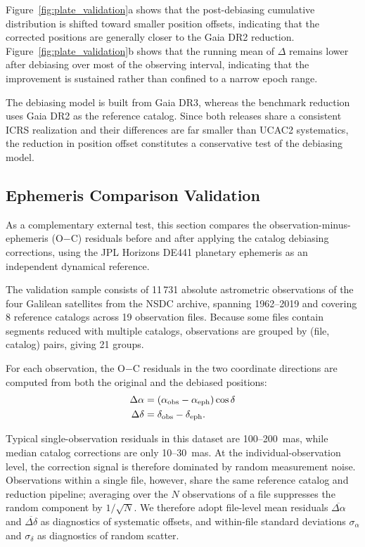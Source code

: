 \documentclass[linenumbers,amsmath,manuscript]{aastex702}
\begin{document}
Figure~\ref{fig:plate_validation}a shows that the post-debiasing cumulative distribution is shifted toward smaller position offsets, indicating that the corrected positions are generally closer to the Gaia DR2 reduction. Figure~\ref{fig:plate_validation}b shows that the running mean of $\Delta$ remains lower after debiasing over most of the observing interval, indicating that the improvement is sustained rather than confined to a narrow epoch range.

The debiasing model is built from Gaia DR3, whereas the benchmark reduction uses Gaia DR2 as the reference catalog. Since both releases share a consistent ICRS realization and their differences are far smaller than UCAC2 systematics, the reduction in position offset constitutes a conservative test of the debiasing model.

\subsection{Ephemeris Comparison Validation}

As a complementary external test, this section compares the observation-minus-ephemeris (O$-$C) residuals before and after applying the catalog debiasing corrections, using the JPL Horizons DE441 planetary ephemeris \citep{Park2021DE441} as an independent dynamical reference.

The validation sample consists of 11\,731 absolute astrometric observations of the four Galilean satellites from the NSDC archive, spanning 1962--2019 and covering 8 reference catalogs across 19 observation files. Because some files contain segments reduced with multiple catalogs, observations are grouped by (file, catalog) pairs, giving 21 groups.

For each observation, the O$-$C residuals in the two coordinate directions are computed from both the original and the debiased positions:
\begin{equation}
\begin{aligned}
\Delta\alpha &= (\alpha_{\rm obs} - \alpha_{\rm eph})\cos\delta\\
\Delta\delta &= \delta_{\rm obs} - \delta_{\rm eph}.
\end{aligned}
\end{equation}

Typical single-observation residuals in this dataset are 100--200~mas, while median catalog corrections are only 10--30~mas. At the individual-observation level, the correction signal is therefore dominated by random measurement noise. Observations within a single file, however, share the same reference catalog and reduction pipeline; averaging over the $N$ observations of a file suppresses the random component by $1/\sqrt{N}$. We therefore adopt file-level mean residuals $\overline{\Delta\alpha}$ and $\overline{\Delta\delta}$ as diagnostics of systematic offsets, and within-file standard deviations $\sigma_\alpha$ and $\sigma_\delta$ as diagnostics of random scatter.
\end{document}
